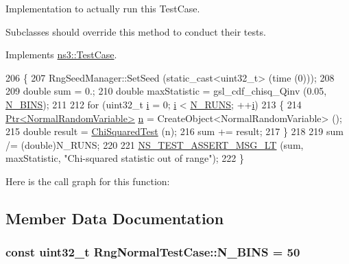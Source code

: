Implementation to actually run this Test\+Case. 

Subclasses should override this method to conduct their tests. 

Implements \hyperlink{classns3_1_1TestCase_a8ff74680cf017ed42011e4be51917a24}{ns3\+::\+Test\+Case}.


\begin{DoxyCode}
206 \{
207   RngSeedManager::SetSeed (static\_cast<uint32\_t> (time (0)));
208 
209   \textcolor{keywordtype}{double} sum = 0.;
210   \textcolor{keywordtype}{double} maxStatistic = gsl\_cdf\_chisq\_Qinv (0.05, \hyperlink{classRngNormalTestCase_af6723698b0b1be88541e9f54a2ba6114}{N\_BINS});
211 
212   \textcolor{keywordflow}{for} (uint32\_t \hyperlink{bernuolliDistribution_8m_a6f6ccfcf58b31cb6412107d9d5281426}{i} = 0; \hyperlink{bernuolliDistribution_8m_a6f6ccfcf58b31cb6412107d9d5281426}{i} < \hyperlink{classRngNormalTestCase_a5f0643e09cb098d4691f53cc7305ddf9}{N\_RUNS}; ++\hyperlink{bernuolliDistribution_8m_a6f6ccfcf58b31cb6412107d9d5281426}{i})
213     \{
214       \hyperlink{classns3_1_1Ptr}{Ptr<NormalRandomVariable>} \hyperlink{namespacesample-rng-plot_aeb5ee5c431e338ef39b7ac5431242e1d}{n} = CreateObject<NormalRandomVariable> ();
215       \textcolor{keywordtype}{double} result = \hyperlink{classRngNormalTestCase_a342c783782fc1ff54521ed57776498ab}{ChiSquaredTest} (n);
216       sum += result;
217     \}
218 
219   sum /= (double)N\_RUNS;
220 
221   \hyperlink{group__testing_ga1d96848b91407c9a0b36583e8b0ad7ae}{NS\_TEST\_ASSERT\_MSG\_LT} (sum, maxStatistic, \textcolor{stringliteral}{"Chi-squared statistic out of range"});
222 \}
\end{DoxyCode}


Here is the call graph for this function\+:




\subsection{Member Data Documentation}
\subsubsection[{\texorpdfstring{N\+\_\+\+B\+I\+NS}{N_BINS}}]{\setlength{\rightskip}{0pt plus 5cm}const uint32\+\_\+t Rng\+Normal\+Test\+Case\+::\+N\+\_\+\+B\+I\+NS = 50\hspace{0.3cm}{\ttfamily [static]}}\hypertarget{classRngNormalTestCase_af6723698b0b1be88541e9f54a2ba6114}{}\label{classRngNormalTestCase_af6723698b0b1be88541e9f54a2ba6114}
